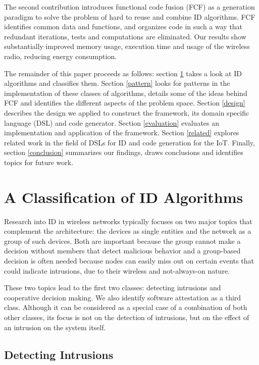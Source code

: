 \documentclass[conference]{IEEEtran}
\begin{document}

The second contribution introduces functional code fusion (FCF) as a generation
paradigm to solve the problem of hard to reuse and combine ID algorithms. FCF
identifies common data and functions, and organizes code in such a way that
redundant iterations, tests and computations are eliminated. Our results show
substantially improved memory usage, execution time and usage of the wireless
radio, reducing energy consumption.


The remainder of this paper proceeds as follows: section \ref{classification}
takes a look at ID algorithms and classifies them. Section \ref{pattern} looks
for patterns in the implementation of these classes of algorithms, details some
of the ideas behind FCF and identifies the different aspects of the problem
space. Section \ref{design} describes the design we applied to construct the
framework, its domain specific language (DSL) and code generator. Section
\ref{evaluation} evaluates an implementation and application of the framework.
Section \ref{related} explores related work in the field of DSLs for ID and
code generation for the IoT. Finally, section \ref{conclusion} summarizes our
findings, draws conclusions and identifies topics for future work.

\section{A Classification of ID Algorithms}
\label{classification}

Research into ID in wireless networks typically focuses on two major topics
that complement the architecture: the devices as single entities and the
network as a group of such devices. Both are important because the group cannot
make a decision without members that detect malicious behavior and a
group-based decision is often needed because nodes can easily miss out on
certain events that could indicate intrusions, due to their wireless and
not-always-on nature.

These two topics lead to the first two classes: detecting intrusions and
cooperative decision making. We also identify software attestation as a third
class. Although it can be considered as a special case of a combination of both
other classes, its focus is not on the detection of intrusions, but on the
effect of an intrusion on the system itself.

\subsection{Detecting Intrusions}
\label{detection}
\end{document}
